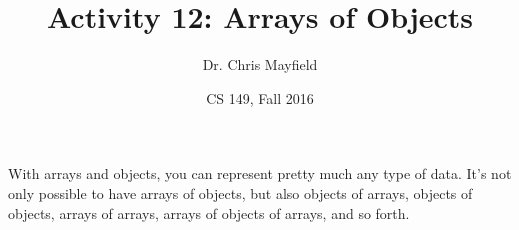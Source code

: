 \documentclass[12pt]{article}
\title{Activity 12: Arrays of Objects}
\author{Dr. Chris Mayfield}
\date{CS 149, Fall 2016}
\begin{document}
\maketitle

With arrays and objects, you can represent pretty much any type of data.
It's not only possible to have arrays of objects, but also objects of arrays, objects of objects, arrays of arrays, arrays of objects of arrays, and so forth.



\end{document}

